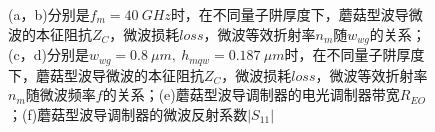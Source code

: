 \begin{figure}[htb]
{\begin{minipage}[]{0.5\textwidth}
		\end{minipage}}
	\caption{(a，b)分别是$f_m = 40~GHz$时，在不同量子阱厚度下，蘑菇型波导微波的本征阻抗$Z_C$，微波损耗$loss$，微波等效折射率$n_m$随$w_{wg}$的关系；(c，d)分别是$w_{wg} = 0.8 ~\mu m,~ h_{mqw} = 0.187 ~\mu m$时，在不同量子阱厚度下，蘑菇型波导微波的本征阻抗$Z_C$，微波损耗$loss$，微波等效折射率$n_m$随微波频率$f$的关系；(e)蘑菇型波导调制器的电光调制器带宽$R_{EO}$；(f)蘑菇型波导调制器的微波反射系数$|S_{11}|$}
	\label{fig_ch2_ms_3dB_S11}
\end{figure}

